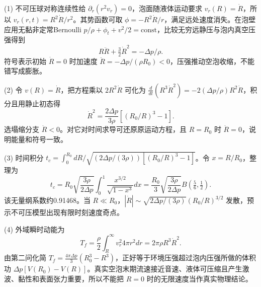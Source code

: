 (1) 不可压球对称连续性给 \(\partial_r(r^2v_r)=0\)，泡面随液体运动要求 \(v_r(R)=\dot R\)，所以 \(v_r(r,t)=R^2\dot R/r^2\)。其势函数可取 \(\phi=-R^2\dot R/r\)，满足远处速度消失。在泡壁应用无黏非定常Bernoulli \(p/\rho+\phi_t+v^2/2=\mathrm{const}\)，比较无穷远静压与泡内真空压强得到
\[
\boxed{R\ddot R+\tfrac32\dot R^2=-\Delta p/\rho}.
\]
符号表示初始 \(\dot R=0\) 时加速度 \(\ddot R=-\Delta p/(\rho R_0)<0\)，压强推动空泡收缩，不能错写成膨胀。

(2) 令 \(v(R)=\dot R\)，把方程乘以 \(2R^2\dot R\) 可化为
\(\frac{d}{dt}(R^3\dot R^2)=-2(\Delta p/\rho)R^2\dot R\)，积分且用静止初态得
\[
\boxed{\dot R^2=\frac{2\Delta p}{3\rho}\left[(R_0/R)^3-1\right]}.
\]
选塌缩分支 \(\dot R<0\)。对它对时间求导可还原原运动方程，且 \(R=R_0\) 时 \(\dot R=0\)，说明能量和符号一致。

(3) 时间积分 \(t_c=\int_0^{R_0}dR/\sqrt{(2\Delta p/(3\rho))[(R_0/R)^3-1]}\)。令 \(x=R/R_0\)，整理为
\[
t_c=R_0\sqrt{\frac{3\rho}{2\Delta p}}\int_0^1\frac{x^{3/2}}{\sqrt{1-x^3}}dx
=\boxed{\frac{R_0}{3}\sqrt{\frac{3\rho}{2\Delta p}}B(\tfrac56,\tfrac12)}.
\]
该无量纲系数约0.91468。当 \(R\ll R_0\)，\(|\dot R|\sim\sqrt{2\Delta p/(3\rho)}(R_0/R)^{3/2}\) 发散，预示不可压模型出现有限时刻速度奇点。

(4) 外域瞬时动能为
\[
T_f=\frac\rho2\int_R^\infty v_r^2 4\pi r^2dr
=2\pi\rho R^3\dot R^2 .
\]
由第二问化简
\(T_f=\frac{4\pi\Delta p}{3}(R_0^3-R^3)\)，正好等于环境压强超过泡内压强所做的体积功 \(\Delta p[V(R_0)-V(R)]\)。真实空泡末期流速接近音速、液体可压缩且产生激波、黏性和表面张力重要，所以不能把 \(R=0\) 时的无限速度当作真实物理结论。
